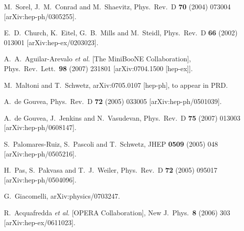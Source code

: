 \documentclass[12pt]{elsart}
\begin{document}
\begin{thebibliography}{99}
  M.~Sorel, J.~M.~Conrad and M.~Shaevitz,
  Phys.\ Rev.\  D {\bf 70} (2004) 073004
  [arXiv:hep-ph/0305255].

  E.~D.~Church, K.~Eitel, G.~B.~Mills and M.~Steidl,
  Phys.\ Rev.\  D {\bf 66} (2002) 013001
  [arXiv:hep-ex/0203023].

  A.~A.~Aguilar-Arevalo {\it et al.}  [The MiniBooNE Collaboration],
  Phys.\ Rev.\ Lett.\  {\bf 98} (2007) 231801
  [arXiv:0704.1500 [hep-ex]].

  M.~Maltoni and T.~Schwetz,
  arXiv:0705.0107 [hep-ph], to appear in PRD.
  
  A.~de Gouvea,
  Phys.\ Rev.\  D {\bf 72} (2005) 033005
  [arXiv:hep-ph/0501039].

  A.~de Gouvea, J.~Jenkins and N.~Vasudevan,
  Phys.\ Rev.\  D {\bf 75} (2007) 013003
  [arXiv:hep-ph/0608147].

  S.~Palomares-Ruiz, S.~Pascoli and T.~Schwetz,
  JHEP {\bf 0509} (2005) 048
  [arXiv:hep-ph/0505216].

  H.~Pas, S.~Pakvasa and T.~J.~Weiler,
  Phys.\ Rev.\  D {\bf 72} (2005) 095017
  [arXiv:hep-ph/0504096].
  
  G.~Giacomelli,
  arXiv:physics/0703247.

  R.~Acquafredda {\it et al.}  [OPERA Collaboration],
  New J.\ Phys.\  {\bf 8} (2006) 303
  [arXiv:hep-ex/0611023].


\end{thebibliography}
\end{document}
